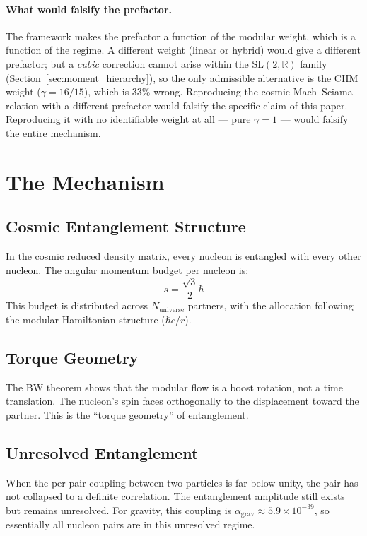 \documentclass[11pt,letterpaper]{article}
\newcommand{\Nuniv}{N_{\mathrm{universe}}}
\begin{document}
\paragraph{What would falsify the prefactor.}
The framework makes the prefactor a function of the modular weight,
which is a function of the regime. A different weight (linear or
hybrid) would give a different prefactor; but a \emph{cubic}
correction cannot arise within the $\mathrm{SL}(2,\mathbb{R})$ family
(Section~\ref{sec:moment_hierarchy}), so the only admissible alternative
is the CHM weight ($\gamma = 16/15$), which is $33\%$ wrong.
Reproducing the cosmic Mach--Sciama relation with a different prefactor
would falsify the specific claim of this paper. Reproducing it with no
identifiable weight at all --- pure $\gamma = 1$ --- would falsify
the entire mechanism.

\section{The Mechanism}

\subsection{Cosmic Entanglement Structure}

In the cosmic reduced density matrix, every nucleon is entangled with every
other nucleon. The angular momentum budget per nucleon is:
\begin{equation}
  s = \frac{\sqrt{3}}{2} \hbar
  \label{eq:spin_budget}
\end{equation}
This budget is distributed across $\Nuniv$ partners, with the
allocation following the modular Hamiltonian structure ($\hbar c/r$).

\subsection{Torque Geometry}

The BW theorem shows that the modular flow is a boost rotation, not a time
translation. The nucleon's spin faces orthogonally to the displacement toward
the partner. This is the ``torque geometry'' of entanglement.

\subsection{Unresolved Entanglement}

When the per-pair coupling between two particles is far below unity, the pair
has not collapsed to a definite correlation. The entanglement amplitude still
exists but remains unresolved. For gravity, this coupling is
$\alpha_{\mathrm{grav}} \approx 5.9 \times 10^{-39}$, so essentially all
nucleon pairs are in this unresolved regime.
\end{document}
